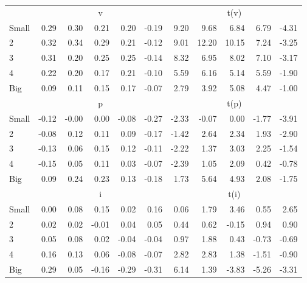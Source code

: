 \begin{table}[!ht]
\begin{tabular}{lrrrrrrrrrr}
  
     & \multicolumn{5}{c}{v} & \multicolumn{5}{c}{t(v)}   \\
     \cmidrule(r){2-6} \cmidrule(r){7-11} 
    Small  & 0.29  & 0.30  & 0.21  & 0.20  & -0.19  & 9.20  & 9.68  & 6.84  & 6.79  & -4.31   \\
    2  & 0.32  & 0.34  & 0.29  & 0.21  & -0.12  & 9.01  & 12.20  & 10.15  & 7.24  & -3.25   \\
    3  & 0.31  & 0.20  & 0.25  & 0.25  & -0.14  & 8.32  & 6.95  & 8.02  & 7.10  & -3.17   \\
    4  & 0.22  & 0.20  & 0.17  & 0.21  & -0.10  & 5.59  & 6.16  & 5.14  & 5.59  & -1.90   \\
    Big  & 0.09  & 0.11  & 0.15  & 0.17  & -0.07  & 2.79  & 3.92  & 5.08  & 4.47  & -1.00   \\
    
  
     & \multicolumn{5}{c}{p} & \multicolumn{5}{c}{t(p)}   \\
     \cmidrule(r){2-6} \cmidrule(r){7-11} 
    Small  & -0.12  & -0.00  & 0.00  & -0.08  & -0.27  & -2.33  & -0.07  & 0.00  & -1.77  & -3.91   \\
    2  & -0.08  & 0.12  & 0.11  & 0.09  & -0.17  & -1.42  & 2.64  & 2.34  & 1.93  & -2.90   \\
    3  & -0.13  & 0.06  & 0.15  & 0.12  & -0.11  & -2.22  & 1.37  & 3.03  & 2.25  & -1.54   \\
    4  & -0.15  & 0.05  & 0.11  & 0.03  & -0.07  & -2.39  & 1.05  & 2.09  & 0.42  & -0.78   \\
    Big  & 0.09  & 0.24  & 0.23  & 0.13  & -0.18  & 1.73  & 5.64  & 4.93  & 2.08  & -1.75   \\
    
  
     & \multicolumn{5}{c}{i} & \multicolumn{5}{c}{t(i)}   \\
     \cmidrule(r){2-6} \cmidrule(r){7-11} 
    Small  & 0.00  & 0.08  & 0.15  & 0.02  & 0.16  & 0.06  & 1.79  & 3.46  & 0.55  & 2.65   \\
    2  & 0.02  & 0.02  & -0.01  & 0.04  & 0.05  & 0.44  & 0.62  & -0.15  & 0.94  & 0.90   \\
    3  & 0.05  & 0.08  & 0.02  & -0.04  & -0.04  & 0.97  & 1.88  & 0.43  & -0.73  & -0.69   \\
    4  & 0.16  & 0.13  & 0.06  & -0.08  & -0.07  & 2.82  & 2.83  & 1.38  & -1.51  & -0.90   \\
    Big  & 0.29  & 0.05  & -0.16  & -0.29  & -0.31  & 6.14  & 1.39  & -3.83  & -5.26  & -3.31   \\
    
  
  \bottomrule
\end{tabular}
\label{tbl:25_Size_Beta_F16}
\end{table}